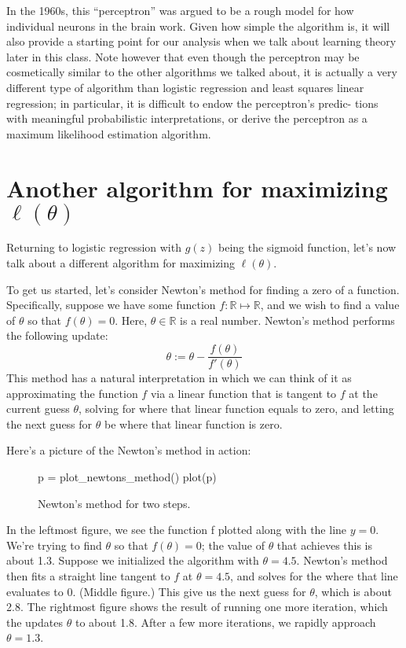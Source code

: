 In the 1960s, this ``perceptron'' was argued to be a rough model for how
individual neurons in the brain work. Given how simple the algorithm is, it
will also provide a starting point for our analysis when we talk about learning
theory later in this class. Note however that even though the perceptron may
be cosmetically similar to the other algorithms we talked about, it is actually
a very different type of algorithm than logistic regression and least squares
linear regression; in particular, it is difficult to endow the perceptron's predic-
tions with meaningful probabilistic interpretations, or derive the perceptron
as a maximum likelihood estimation algorithm.


\section{Another algorithm for maximizing $\ell(\theta)$}

Returning to logistic regression with $g(z)$ being the sigmoid function, let's
now talk about a different algorithm for maximizing $\ell(\theta)$.

To get us started, let's consider Newton's method for finding a zero of a
function. Specifically, suppose we have some function $f : \mathbb R \mapsto \mathbb R$, and we
wish to find a value of $\theta$ so that $f(\theta) = 0$. Here, $\theta \in \mathbb R$ is a real number.
Newton's method performs the following update:
\begin{equation}
    \theta := \theta - \frac{f(\theta)}{f'(\theta)}
\end{equation}
This method has a natural interpretation in which we can think of it as
approximating the function $f$ via a linear function that is tangent to $f$ at
the current guess $\theta$, solving for where that linear function equals to zero, and
letting the next guess for $\theta$ be where that linear function is zero.

Here's a picture of the Newton's method in action:
\begin{figure*}
    \caption{
        \label{fig:newtons_method} Newton's method for two steps.
    }
    \begin{jlcode}
    p = plot_newtons_method()
    plot(p)
    \end{jlcode}
    \begin{center}
    \end{center}
\end{figure*}

In the leftmost figure, we see the function f plotted along with the line
$y = 0$. We're trying to find $\theta$ so that $f(\theta) = 0$; the value of $\theta$ that achieves this
is about 1.3. Suppose we initialized the algorithm with $\theta = 4.5$. Newton's
method then fits a straight line tangent to $f$ at $\theta = 4.5$, and solves for the
where that line evaluates to 0. (Middle figure.) This give us the next guess
for $\theta$, which is about 2.8. The rightmost figure shows the result of running
one more iteration, which the updates $\theta$ to about 1.8. After a few more
iterations, we rapidly approach $\theta = 1.3$.

